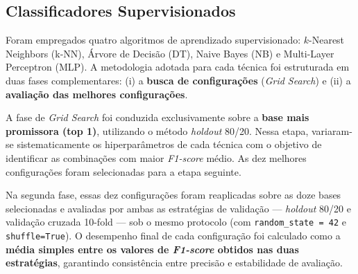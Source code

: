 \documentclass[12pt]{article}
\begin{document}
\subsection{Classificadores Supervisionados}

Foram empregados quatro algoritmos de aprendizado supervisionado: \(k\)-Nearest Neighbors (k-NN), Árvore de Decisão (DT), Naive Bayes (NB) e Multi-Layer Perceptron (MLP).  
A metodologia adotada para cada técnica foi estruturada em duas fases complementares: (i) a \textbf{busca de configurações} (\textit{Grid Search}) e (ii) a \textbf{avaliação das melhores configurações}.  

A fase de \textit{Grid Search} foi conduzida exclusivamente sobre a \textbf{base mais promissora (top 1)}, utilizando o método \textit{holdout} 80/20. Nessa etapa, variaram-se sistematicamente os hiperparâmetros de cada técnica com o objetivo de identificar as combinações com maior \textit{F1-score} médio. As dez melhores configurações foram selecionadas para a etapa seguinte.  

Na segunda fase, essas dez configurações foram reaplicadas sobre as doze bases selecionadas e avaliadas por ambas as estratégias de validação — \textit{holdout} 80/20 e validação cruzada 10-fold — sob o mesmo protocolo (com \texttt{random\_state = 42} e \texttt{shuffle=True}).  
O desempenho final de cada configuração foi calculado como a \textbf{média simples entre os valores de \textit{F1-score} obtidos nas duas estratégias}, garantindo consistência entre precisão e estabilidade de avaliação.
\end{document}
